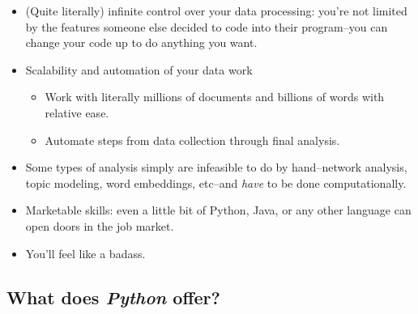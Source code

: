 \documentclass[11pt]{article}
\providecommand{\tightlist}{%
      \setlength{\itemsep}{0pt}\setlength{\parskip}{0pt}}
\begin{document}
\begin{itemize}
\item
  (Quite literally) infinite control over your data processing: you're
  not limited by the features someone else decided to code into their
  program--you can change your code up to do anything you want.
\item
  Scalability and automation of your data work

  \begin{itemize}
  \tightlist
  \item
    Work with literally millions of documents and billions of words with
    relative ease.
  \item
    Automate steps from data collection through final analysis.
  \end{itemize}
\item
  Some types of analysis simply are infeasible to do by hand--network
  analysis, topic modeling, word embeddings, etc--and \emph{have} to be
  done computationally.
\item
  Marketable skills: even a little bit of Python, Java, or any other
  language can open doors in the job market.
\item
  You'll feel like a badass.
\end{itemize}

    \hypertarget{what-does-python-offer}{%
\subsection{\texorpdfstring{What does \emph{Python}
offer?}{What does Python offer?}}\label{what-does-python-offer}}
\end{document}
